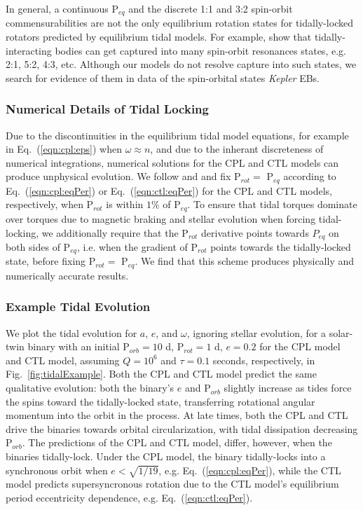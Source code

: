 \documentclass[twocolumn]{aastex61}
\newcommand{\kepler}[0]{\textit{Kepler}\xspace}
\begin{document}
In general, a continuous P$_{eq}$ and the discrete 1:1 and 3:2 spin-orbit commensurabilities are not the only equilibrium rotation states for tidally-locked rotators predicted by equilibrium tidal models. For example, \citet{Rodriguez2012} show that tidally-interacting bodies can get captured into many spin-orbit resonances states, e.g. 2:1, 5:2, 4:3, etc. Although our models do not resolve capture into such states, we search for evidence of them in data of the spin-orbital states \kepler EBs.

\subsubsection{Numerical Details of Tidal Locking}

Due to the discontinuities in the equilibrium tidal model equations, for example in Eq.~(\ref{eqn:cpl:eps}) when $\omega \approx n$, and due to the inherant discreteness of numerical integrations, numerical solutions for the CPL and CTL models can produce unphysical evolution. We follow \citet{Barnes2013} and \citet{Fleming2018} and fix P$_{rot} = $ P$_{eq}$ according to Eq.~(\ref{eqn:cpl:eqPer}) or Eq.~(\ref{eqn:ctl:eqPer}) for the CPL and CTL models, respectively, when P$_{rot}$ is within $1\%$ of P$_{eq}$.  To ensure that tidal torques dominate over torques due to magnetic braking and stellar evolution when forcing tidal-locking, we additionally require that the P$_{rot}$ derivative points towards $P_{eq}$ on both sides of P$_{eq}$, i.e. when the gradient of P$_{rot}$ points towards the tidally-locked state, before fixing P$_{rot} = $ P$_{eq}$. We find that this scheme produces physically and numerically accurate results. 

\subsubsection{Example Tidal Evolution} \label{sec:methods:eqtideExample}

We plot the tidal evolution for $a$, $e$, and $\omega$, ignoring stellar evolution, for a solar-twin binary with an initial P$_{orb} = 10$ d, P$_{rot} = 1$ d, $e = 0.2$ for the CPL model and CTL model, assuming $Q=10^6$ and $\tau = 0.1$ seconds, respectively, in Fig.~\ref{fig:tidalExample}. Both the CPL and CTL model predict the same qualitative evolution: both the binary's $e$ and P$_{orb}$ slightly increase as tides force the spins toward the tidally-locked state, transferring rotational angular momentum into the orbit in the process.  At late times, both the CPL and CTL drive the binaries towards orbital circularization, with tidal dissipation decreasing P$_{orb}$. The predictions of the CPL and CTL model, differ, however, when the binaries tidally-lock.  Under the CPL model, the binary tidally-locks into a synchronous orbit when $e < \sqrt{1/19}$, e.g. Eq.~(\ref{eqn:cpl:eqPer}), while the CTL model predicts supersyncronous rotation due to the CTL model's equilibrium period eccentricity dependence, e.g. Eq.~(\ref{eqn:ctl:eqPer}).
\end{document}
